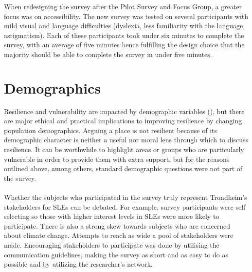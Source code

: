 When redesigning the survey after the Pilot Survey and Focus Group, a greater focus was on accessibility. The new survey was tested on several participants with mild visual and language difficulties (dyslexia, less familiarity with the language, astigmatism).  Each of these participants took under six minutes to complete the survey, with an average of five minutes hence fulfilling the design choice that the majority should be able to complete the survey in under five minutes. 
\paragraph{}



\section{Demographics}
Resilience and vulnerability are impacted by demographic variables (\cite{rod_integrated_2012}), but there are major ethical and practical implications to improving resilience by changing population demographics. Arguing a place is not resilient because of its demographic character is neither a useful nor moral lens through which to discuss resilience. It can be worthwhile to highlight areas or groups who are particularly vulnerable in order to provide them with extra support, but for the reasons outlined above, among others, standard demographic questions were not part of the survey. 


\paragraph{}
Whether the subjects who participated in the survey truly represent Trondheim's stakeholders for SLEs can be debated. For example, survey participants were self selecting so those with higher interest levels in SLEs were more likely to participate. There is also a strong skew towards subjects who are concerned about climate change. Attempts to reach as wide a pool of stakeholders were made. Encouraging stakeholders to participate was done by utilising the communication guidelines, making the survey as short and as easy to do as possible and by utilizing the researcher's network. 



